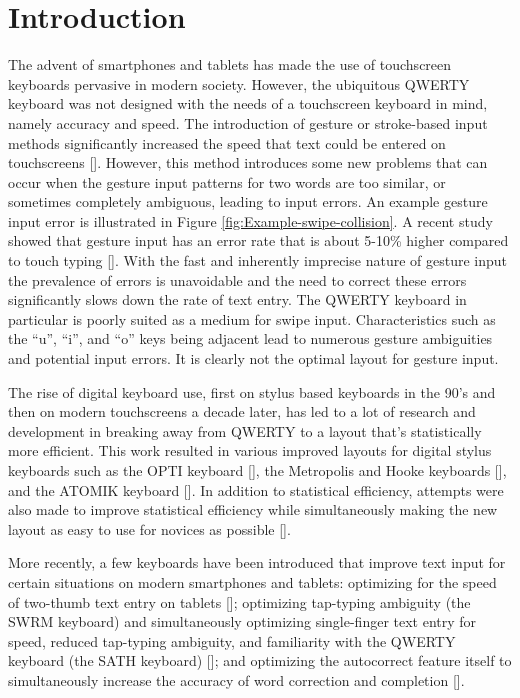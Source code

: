 \documentclass[final,1p,times,authoryear]{elsarticle}
\begin{document}
\section{Introduction}
The advent of smartphones and tablets has made the use of touchscreen
keyboards pervasive in modern society. However, the ubiquitous QWERTY
keyboard was not designed with the needs of a touchscreen keyboard
in mind, namely accuracy and speed. The introduction of gesture or stroke-based 
input methods significantly increased the speed that text could be
entered on touchscreens [\cite{Montgomery,SHARK,shapeWriter,swype}]. 
However, this method introduces some new problems that can occur when the
gesture input patterns for two words are too similar, or sometimes completely ambiguous, 
leading to input errors. An example gesture input error is illustrated in Figure
\ref{fig:Example-swipe-collision}. A recent study showed that gesture input has an error rate that 
is about 5-10\% higher compared to touch typing [\cite{octopus}]. With the fast and inherently imprecise
nature of gesture input the prevalence of errors is unavoidable and
the need to correct these errors significantly slows down the rate of text entry.
The QWERTY keyboard in particular is poorly suited as a medium
for swipe input. Characteristics such as the ``u'', ``i'', and
``o'' keys being adjacent lead to numerous gesture ambiguities and
potential input errors. It is clearly not the optimal layout for gesture input. 

The rise of digital keyboard use, first on stylus based keyboards in the 90's and then
on modern touchscreens a decade later, has led to a lot of research and development in 
breaking away from QWERTY to a layout that's statistically more efficient. This work resulted
in various improved layouts for digital stylus keyboards such as the OPTI keyboard [\cite{OPTI}],
the Metropolis and Hooke keyboards [\cite{Metropolis}], and the ATOMIK keyboard [\cite{ATOMIK}].
In addition to statistical efficiency, attempts were also made to improve statistical efficiency while 
simultaneously making the new layout as easy to use for novices as possible [\cite{layoutMatters}].

More recently, a few keyboards have been introduced that improve text input for certain situations on modern smartphones and tablets:
optimizing for the speed of two-thumb text entry on tablets [\cite{oulasvirta2013improving}];
optimizing tap-typing ambiguity (the SWRM keyboard) and simultaneously optimizing single-finger text entry for speed, reduced tap-typing ambiguity, and familiarity with the QWERTY keyboard (the SATH keyboard) [\cite{Dunlop:2012:MPO:2207676.2208659}];
and optimizing the autocorrect feature itself to simultaneously increase the accuracy of word correction and completion [\cite{Xiaojun:Complete}].
\end{document}
